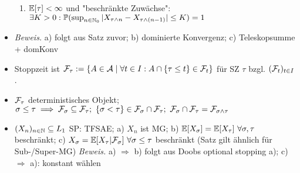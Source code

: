 \documentclass[12pt]{scrartcl}
\begin{document}
\begin{itemize}
\begin{enumerate}
			\item $\mathbb{E}[\tau]<\infty$ und "beschränkte Zuwächse": $\exists K>0:\mathbb{P}(\sup_{n\in\mathbb{N}_0}|X_{\tau\wedge n}-X_{\tau\wedge(n-1)}|\leq K)=1$
		\end{enumerate}
		\item \textit{Beweis.} a) folgt aus Satz zuvor; b) dominierte Konvergenz; c) Teleskopsumme + domKonv
		\item Stoppzeit  ist $\mathcal{F}_\tau:=\lbrace	A\in\mathcal{A}\mid\forall t\in I:A\cap\lbrace\tau\leq t\rbrace\in\mathcal{F}_t\rbrace$ für SZ $\tau$ bzgl. $(\mathcal{F}_t)_{t\in I}$.
		\item $\mathcal{F}_\tau$ deterministisches Objekt; $\sigma\leq\tau\implies\mathcal{F}_\sigma\subseteq\mathcal{F}_\tau;~\lbrace\sigma<\tau\rbrace\in\mathcal{F}_\sigma\cap\mathcal{F}_\tau;~\mathcal{F}_\sigma\cap\mathcal{F}_\tau=\mathcal{F}_{\sigma\wedge\tau}$
		\item {} $(X_n)_{n\in\mathbb{N}}\subseteq L_1$ SP: TFSAE; a) $X_n$ ist MG; b) $\mathbb{E}[X_\sigma]=\mathbb{E}[X_\tau]~\forall\sigma,\tau$ beschränkt; c) $X_\sigma=\mathbb{E}[X_\tau|\mathcal{F}_\sigma]~\forall \sigma\leq\tau$ beschränkt (Satz gilt ähnlich für Sub-/Super-MG)
		\textit{Beweis.} a) $\Rightarrow$ b) folgt aus Doobs optional stopping a); c) $\Rightarrow$ a): konstant wählen
	\end{itemize}
	
\end{document}

